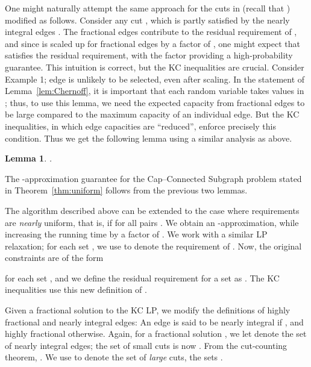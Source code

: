 \documentclass[11pt]{article}
\newcounter{thm0Rcopies}
\newcounter{thm_saved}
\newtheorem{lemma}{Lemma}[section]
\def\capR{Cap--Connected Subgraph\xspace}
\renewenvironment{proof}{\vspace{-0.1in}\noindent{\bf Proof:}}{\hspace*{\fill}\par}
\begin{document}
One might naturally attempt the same approach for the cuts in 
(recall that ) modified as follows. Consider any cut , which is partly satisfied
by the nearly integral edges . The fractional edges contribute to
the residual requirement of , and since  is scaled up for
fractional edges by a factor of , one might expect that
 satisfies the residual requirement, with the  factor
providing a high-probability guarantee. This intuition is correct, but
the KC inequalities are crucial. Consider Example 1; edge  is
unlikely to be selected, even after scaling. In the statement of
Lemma~\ref{lem:Chernoff}, it is important that each random variable
takes values in ; thus, to use this lemma, we need the expected
capacity from fractional edges to be large compared to the maximum
capacity of an individual edge. But the KC inequalities,
in which edge capacities are ``reduced'', enforce precisely this
condition. Thus we get the following lemma using a similar analysis as above.

\begin{lemma}\label{lem:smallCuts}
  .
\end{lemma}
\iffalse
\begin{proof}
  By Theorem~\ref{thm:cutCounting}, the number of cuts in 
  is at most ; it thus suffices to show that for any ,
  the probability it is not satisified by  is at most . Assume  is not
  satisfied by , otherwise we are done.

  Since  is good, by condition (b) above, we have . Thus

  
  Once again since the coefficient of  is at most , as in the
  proof of Lemma \ref{lem:largeCuts}, we get that the probability 
  is not satisfied by  is at most ,
  and we are done.
\end{proof}
\fi
\noindent

The -approximation guarantee for the \capR problem stated
in Theorem~\ref{thm:uniform} follows from the previous two lemmas.


\iffalse
The algorithm described above can be extended to the case where
requirements are \emph{nearly} uniform, that is, if  for all pairs . We obtain an
-approximation, while increasing the running time by
a factor of . We work with a similar LP relaxation;
for each set , we use  to denote the requirement of . Now, the
original constraints are of the form

for each set , and we define the residual requirement for a set as
. The KC inequalities use
this new definition of .

Given a fractional solution  to the KC LP, we modify the
definitions of highly fractional and nearly integral edges: An edge
 is said to be nearly integral if , and highly fractional otherwise. Again, for a fractional
solution , we let  denote the set of nearly integral edges;
the set  of small cuts is now . From the cut-counting theorem, .  We use  to denote the set of \emph{large}
cuts, the sets .
\end{document}
